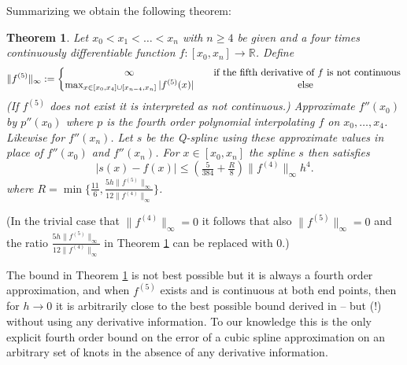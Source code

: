 \documentclass[12pt]{article}
\newtheorem{theorem}{Theorem}%
\def\re{{\mathbb{R}}}
\def\ignore#1{}
\begin{document}
\ignore{
When $f^{(5)}$ is not continuous on $[x_0,x_4]$ a closer consideration of the
divided differences can be used:
The divided differences are initialized as $f^{(0)}_{x_i}(t)\equiv f(x_i)=:f[x_i] $.
The first divided difference is given by
$$
f[x_0,x_1]:=\tfrac{f[x_1]-f[x_0]}{x_1-x_0}=\int_0^1 f'(x_0+t(x_1-x_0))dt.
$$
Setting $f^{(1)}_{x_0,x_1}(t):=f'(x_0+t(x_1-x_0))$, the divided difference $f[x_0,x_1]$
is the average of $f^{(1)}_{x_0,x_1}(t)$ for $t\in[0,1]$.
\hfill\break
$$
f[x_0,x_1,x_2]:=\tfrac{f[x_2,x_1]-f[x_1,x_0]}{x_2-x_0}=
\tfrac 1{x_2-x_0} \left( \int_0^1 f'(x_1+t(x_2-x_1))dt - \int_0^1 f'(x_0+t(x_1-x_0))dt  \right)
$$
$$
=\tfrac 1{x_2-x_0}  \int_0^1 f'(x_1+t(x_2-x_1)) -  f'(x_0+t(x_1-x_0))dt  .
$$
}


Summarizing we obtain the following theorem:

\begin{theorem}\label{theorem2}
  Let $x_0<x_1<\ldots <x_n$ with $n\ge 4$ be given and a four times continuously
  differentiable function $f:[x_0,x_n]\to\re$. 
  Define
  $$
  \|f^{(5)}\|_\infty:=\left\{\begin{matrix}
      \infty && \hbox{if the fifth derivative
        of\ } f \hbox{\ is not continuous} \\
      \max_{x\in [x_0,x_4]\cup[x_{n-4},x_n]} |f^{(5)}(x)| && \hbox{else }
      \end{matrix}\right.
  $$
  (If  $f^{(5)}$ does not exist it is interpreted as not continuous.) 
  Approximate $f''(x_0)$ by $p''(x_0)$ where $p$ is the fourth
  order polynomial interpolating $f$ on $x_0,\ldots,x_4$.
  Likewise for $f''(x_n)$. 
  Let $s$ be the Q-spline using these approximate values
  in place of  $f''(x_0)$ and  $f''(x_n)$.
  For $x\in[x_0,x_n]$ the spline $s$ then satisfies
  $$
  |s(x)-f(x)|\le \left(\tfrac{5}{384}+\tfrac{R}{8}\right)
  \|f^{(4)}\|_\infty h^4.
  $$
  where $R = \min\{\tfrac{11}{6},
  \tfrac{5h\|f^{(5)}\|_\infty}{12\|f^{(4)}\|_\infty}\}$.
\end{theorem}

(In the trivial case that $\|f^{(4)}\|_\infty=0$ it follows that also
$\|f^{(5)}\|_\infty=0$ and the ratio
$\tfrac{5h\|f^{(5)}\|_\infty}{12\|f^{(4)}\|_\infty}$
in Theorem \ref{theorem2} can be replaced with 0.)

The bound in Theorem \ref{theorem2} is not best possible
but it is always a fourth order approximation, and 
when $f^{(5)}$ exists and is continuous at both end points, then for
$h\to 0$ it is arbitrarily close to the best possible bound
derived in \cite{HallMeyer} -- but (!) without using any derivative information.
To our knowledge this is the only explicit fourth order bound
on the error of a cubic spline approximation on an arbitrary 
set of knots in the absence of any
derivative information.
\end{document}
